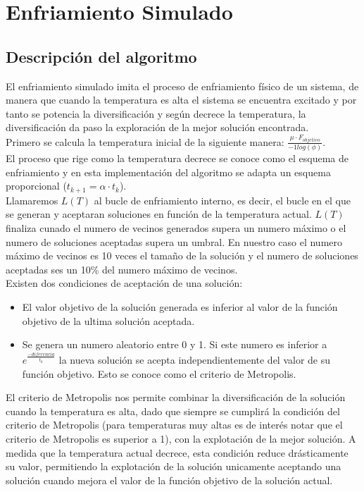 \newpage
\section{Enfriamiento Simulado}
\subsection{Descripción del algoritmo}
El enfriamiento simulado imita el proceso de enfriamiento físico de un sistema, de manera que cuando la temperatura es alta el sistema se encuentra excitado y por tanto se potencia la diversificación y según decrece la temperatura, la diversificación da paso la exploración de la mejor solución encontrada. \\
Primero se calcula la temperatura inicial de la siguiente manera: $ \frac{\mu \cdot F_{objetivo}}{-1log(\phi)} $. \\
El proceso que rige como la temperatura decrece se conoce como el esquema de enfriamiento y en esta implementación del algoritmo se adapta un esquema proporcional ($t_{k+1} = \alpha \cdot t_{k}$).\\
Llamaremos $L(T)$ al bucle de enfriamiento interno, es decir, el bucle en el que se generan y aceptaran soluciones en función de la temperatura actual. $L(T)$ finaliza cunado el numero de vecinos generados supera un numero máximo o el numero de soluciones aceptadas supera un umbral.
En nuestro caso el numero máximo de vecinos es 10 veces el tamaño de la solución y el numero de soluciones aceptadas ses un 10\% del numero máximo de vecinos.\\
Existen dos condiciones de aceptación de una solución:
\begin{itemize}
   \item El valor objetivo de la solución generada es inferior al valor de la función objetivo de la ultima solución aceptada.
   \item Se genera un numero aleatorio entre 0 y 1. Si este numero es inferior a $e^{\frac{-diferencia}{t_{k}}}$ la nueva solución se acepta independientemente del valor de su función objetivo. Esto se conoce como el criterio de Metropolis.
\end{itemize}
El criterio de Metropolis nos permite combinar la diversificación de la solución cuando la temperatura es alta, dado que siempre se cumplirá la condición del criterio de Metropolis (para temperaturas muy altas es de interés notar que el criterio de Metropolis es superior a 1), con la explotación de la mejor solución. A medida que la temperatura actual decrece, esta condición reduce drásticamente su valor, permitiendo la explotación de la solución unicamente aceptando una solución cuando mejora el valor de la función objetivo de la solución actual.
